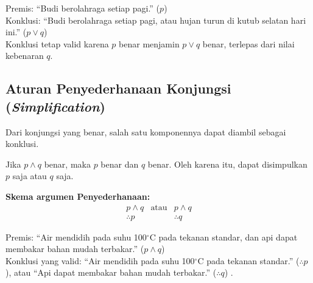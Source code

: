 \begin{contoh}
Premis: ``Budi berolahraga setiap pagi.'' ($p$) \\
Konklusi: ``Budi berolahraga setiap pagi, atau hujan turun di kutub selatan hari ini.'' ($p \vee q$) \\
Konklusi tetap valid karena $p$ benar menjamin $p \vee q$ benar, terlepas dari nilai kebenaran $q$.
\end{contoh}

\subsection{Aturan Penyederhanaan Konjungsi (\textit{Simplification})}

Dari konjungsi yang benar, salah satu komponennya dapat diambil sebagai konklusi.

\begin{teorema}[Penyederhanaan]
Jika $p \land q$ benar, maka $p$ benar dan $q$ benar. Oleh karena itu, dapat disimpulkan $p$ saja atau $q$ saja.
\end{teorema}

\textbf{Skema argumen Penyederhanaan:}
\[
\begin{array}{ccc}
p \wedge q & \text{atau} & p \wedge q\\
\hline
\therefore p & & \therefore q
\end{array}
\]

\begin{contoh}
Premis: ``Air mendidih pada suhu 100$^\circ$C pada tekanan standar, dan api dapat membakar bahan mudah terbakar.'' ($p \land q$) \\
Konklusi yang valid: ``Air mendidih pada suhu 100$^\circ$C pada tekanan standar.'' ($\therefore p$), atau ``Api dapat membakar bahan mudah terbakar.'' ($\therefore q$) \cite{rosen2019}.
\end{contoh}
